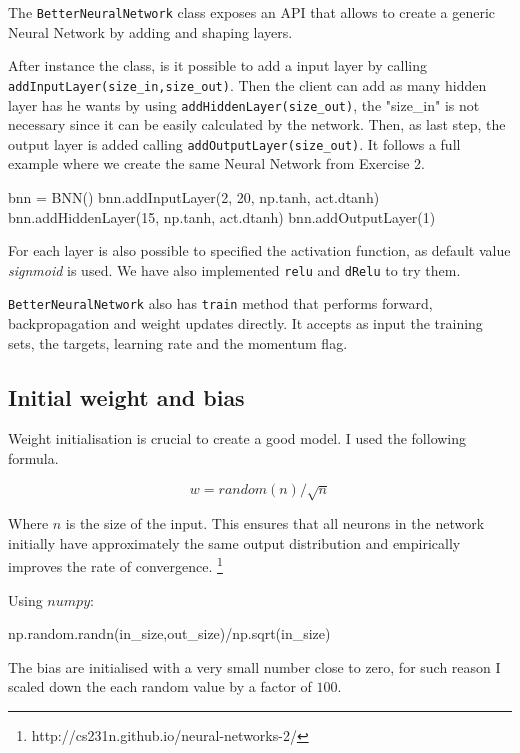 \documentclass[11pt]{article}
\begin{document}
The \texttt{BetterNeuralNetwork} class exposes an API that allows to create a generic Neural Network by adding and shaping layers.

After instance the class, is it possible to add a input layer by calling \texttt{addInputLayer(size\_in,size\_out)}. Then the client can add as many hidden layer has he wants by using \texttt{addHiddenLayer(size\_out)}, the "size\_in" is not necessary since it can be easily calculated by the network. Then, as last step, the output layer is added calling \texttt{addOutputLayer(size\_out)}. It follows a full example where we create the same Neural Network from Exercise 2.
\begin{python}
   bnn = BNN()
   bnn.addInputLayer(2, 20, np.tanh, act.dtanh)
   bnn.addHiddenLayer(15, np.tanh, act.dtanh)
   bnn.addOutputLayer(1)
\end{python}

For each layer is also possible to specified the activation function, as default value \emph{signmoid} is used. We have also implemented \texttt{relu} and \texttt{dRelu} to try them.

\texttt{BetterNeuralNetwork} also has \texttt{train} method that performs forward, backpropagation and weight updates directly. It accepts as input the training sets, the targets, learning rate and the momentum flag.

\subsection{Initial weight and bias}
Weight initialisation is crucial to create a good model. I used the following formula.

$$w = random(n)/\sqrt{n}$$

Where $n$ is the size of the input. This ensures that all neurons in the network initially have approximately the same output distribution and empirically improves the rate of convergence. \footnote{http://cs231n.github.io/neural-networks-2/}

Using $numpy$:
\begin{python}
np.random.randn(in_size,out_size)/np.sqrt(in_size)
\end{python}

The bias are initialised with a very small number close to zero, for such reason I scaled down the each random value by a factor of $100$.
\end{document}
